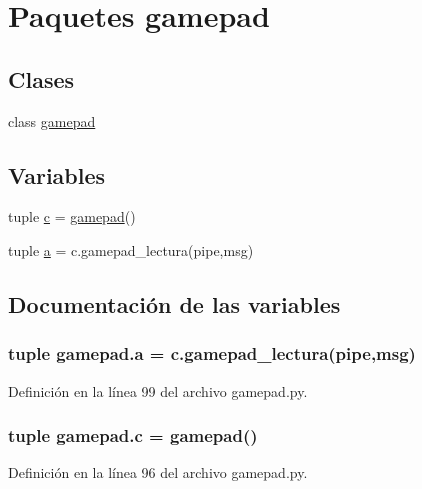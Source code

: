 \hypertarget{namespacegamepad}{
\section{Paquetes gamepad}
\label{namespacegamepad}
}
\subsection*{Clases}
\begin{DoxyCompactItemize}
\item 
class \hyperlink{classgamepad_1_1gamepad}{gamepad}
\end{DoxyCompactItemize}
\subsection*{Variables}
\begin{DoxyCompactItemize}
\item 
tuple \hyperlink{namespacegamepad_ac2d3a197e612c4d688cc70b717d040f4}{c} = \hyperlink{classgamepad_1_1gamepad}{gamepad}()
\item 
tuple \hyperlink{namespacegamepad_a71ea7805d13c1a442407730008cf5247}{a} = c.gamepad\_\-lectura(pipe,msg)
\end{DoxyCompactItemize}


\subsection{Documentación de las variables}
\hypertarget{namespacegamepad_a71ea7805d13c1a442407730008cf5247}{
\subsubsection[{a}]{\setlength{\rightskip}{0pt plus 5cm}tuple {\bf gamepad.a} = c.gamepad\_\-lectura(pipe,msg)}}
\label{namespacegamepad_a71ea7805d13c1a442407730008cf5247}


Definición en la línea 99 del archivo gamepad.py.

\hypertarget{namespacegamepad_ac2d3a197e612c4d688cc70b717d040f4}{
\subsubsection[{c}]{\setlength{\rightskip}{0pt plus 5cm}tuple {\bf gamepad.c} = {\bf gamepad}()}}
\label{namespacegamepad_ac2d3a197e612c4d688cc70b717d040f4}


Definición en la línea 96 del archivo gamepad.py.

